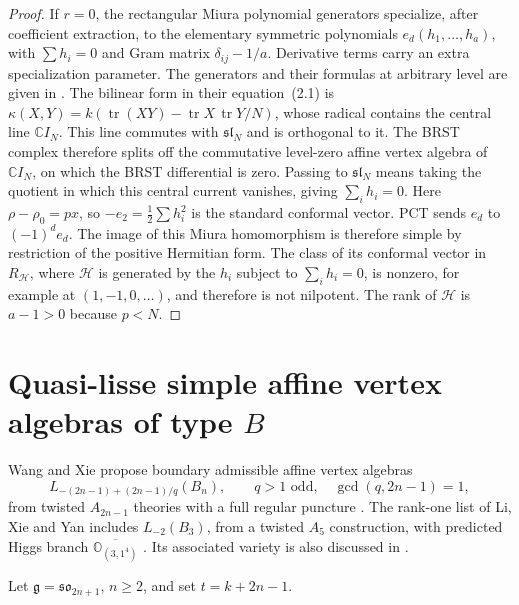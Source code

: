 \documentclass[11pt,a4paper]{amsart}
\numberwithin{equation}{section}
\theoremstyle{definition}
\theoremstyle{remark}
\newcommand{\C}{\mathbb C}
\newcommand{\g}{\mathfrak g}
\newcommand{\OO}{\mathbb O}
\newcommand{\sog}{\mathfrak{so}}
\newcommand{\slg}{\mathfrak{sl}}
\newcommand{\tr}{\operatorname{tr}}
\begin{document}
\begin{proof}
If $r=0$, the rectangular Miura polynomial generators specialize,
after coefficient extraction, to the elementary symmetric polynomials
$e_d(h_1,\ldots,h_a)$, with $\sum h_i=0$ and Gram matrix
$\delta_{ij}-1/a$. Derivative terms carry an extra specialization
parameter. The generators and their formulas at arbitrary level are given in
\cite[Theorem~3.1 and Corollary~3.2]{ArakawaMolev2017}. The bilinear form in their equation~(2.1) is
$\kappa(X,Y)=k(\tr(XY)-\tr X\,\tr Y/N)$, whose radical contains the
central line $\C I_N$. This line commutes with $\slg_N$ and is
orthogonal to it. The BRST complex therefore splits off the
commutative level-zero affine vertex algebra of $\C I_N$, on which
the BRST differential is zero. Passing to $\slg_N$ means taking the
quotient in which this central current vanishes, giving $\sum_i h_i=0$.
Here $\rho-\rho_0=px$, so $-e_2=\frac12\sum h_i^2$ is the standard
conformal vector. PCT sends $e_d$ to $(-1)^de_d$. The image of this Miura homomorphism is
therefore simple by restriction of the positive Hermitian form. The class of its conformal vector in $R_{\mathcal H}$, where $\mathcal H$ is generated by the $h_i$
subject to $\sum_i h_i=0$, is nonzero, for example at $(1,-1,0,\ldots)$, and therefore is not
nilpotent. The rank of $\mathcal H$ is $a-1>0$ because $p<N$.
\end{proof}


\section{\texorpdfstring{Quasi-lisse simple affine vertex algebras of type $B$}{Quasi-lisse simple affine vertex algebras of type B}}\label{sec:type-B}
Wang and Xie propose boundary admissible affine vertex algebras
$$
 L_{-(2n-1)+(2n-1)/q}(B_n),\qquad
 q>1\text{ odd},\quad\gcd(q,2n-1)=1,
$$
from twisted $A_{2n-1}$ theories with a full regular puncture
\cite[Section~5]{WangXie2019}.
The rank-one list of Li, Xie and Yan includes $L_{-2}(B_3)$,
from a twisted $A_5$ construction, with predicted Higgs branch
$\overline{\OO_{(3,1^4)}}$
\cite[Table~4 and Appendix~B.1]{LiXieYan2023}.
Its associated variety is also discussed in \cite{ArakawaEtAl2025}.

Let $\g=\sog_{2n+1}$, $n\ge2$, and set $t=k+2n-1$.
\end{document}

